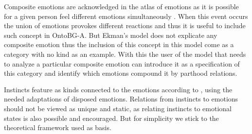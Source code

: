 Composite emotions are acknowledged in the atlas of emotions as it is possible for a given person feel different emotions simultaneously \citep{ekman_are_basic_emotions_nodate}. When this event occurs the union of emotions provokes different reactions and thus it is useful to include such concept in OntoBG-A. But Ekman's model does not explicate any composite emotion thus the inclusion of this concept in this model come as a category with no kind as an example. With this the user of the model that needs to analyze a particular composite emotion can introduce it as a specification of this category and identify which emotions compound it by parthood relations.

Instincts feature as kinds connected to the emotions according to \citeauthor{dillon_way_2010}, using the needed adaptations of disposed emotions. Relations from instincts to emotions should not be viewed as unique and static, as relating instincts to emotional states is also possible and encouraged. But for simplicity we stick to the theoretical framework used as basis.